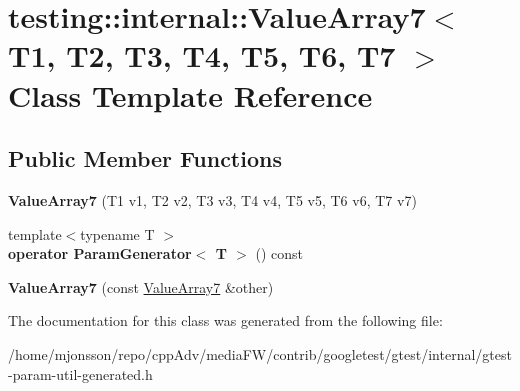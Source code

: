 \hypertarget{classtesting_1_1internal_1_1ValueArray7}{}\section{testing\+:\+:internal\+:\+:Value\+Array7$<$ T1, T2, T3, T4, T5, T6, T7 $>$ Class Template Reference}
\label{classtesting_1_1internal_1_1ValueArray7}
\subsection*{Public Member Functions}
\begin{DoxyCompactItemize}
\item 
\mbox{\label{classtesting_1_1internal_1_1ValueArray7_a34570dbbcc50d20f94e4a0c693e42f09}} 
{\bfseries Value\+Array7} (T1 v1, T2 v2, T3 v3, T4 v4, T5 v5, T6 v6, T7 v7)
\item 
\mbox{\label{classtesting_1_1internal_1_1ValueArray7_a4ab41f4a5687896e159c69f581d0a673}} 
{\footnotesize template$<$typename T $>$ }\\{\bfseries operator Param\+Generator$<$ T $>$} () const
\item 
\mbox{\label{classtesting_1_1internal_1_1ValueArray7_ab4be0da0f772c885c6fe681ea486ece4}} 
{\bfseries Value\+Array7} (const \hyperlink{classtesting_1_1internal_1_1ValueArray7}{Value\+Array7} \&other)
\end{DoxyCompactItemize}


The documentation for this class was generated from the following file\+:\begin{DoxyCompactItemize}
\item 
/home/mjonsson/repo/cpp\+Adv/media\+F\+W/contrib/googletest/gtest/internal/gtest-\/param-\/util-\/generated.\+h\end{DoxyCompactItemize}
